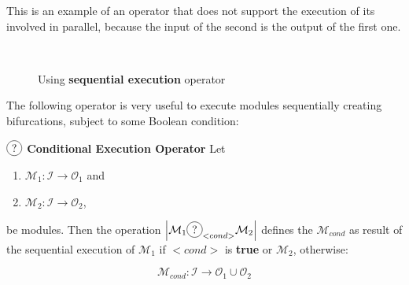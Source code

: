 This is an example of an operator that does not support the execution of its involved \cms{} in parallel, because the input of the second \cm{} is the output of the first one.


\begin{figure}[h]
	\centering
	\hspace{0.05\linewidth}
	\\
	\caption[]{Using {\bf sequential execution} operator}
	\label{fig:seq_example}
\end{figure}

\separation

The following operator is very useful to execute modules sequentially creating bifurcations, subject to some Boolean condition:

\begin{definition}\label{op:conditional}
$\circled{?}$ {\bf Conditional Execution Operator} Let
\begin{enumerate}%
	\item $\mathcal{M}_1 : \mathcal{I} \rightarrow \mathcal{O}_1$ and  
	\item $\mathcal{M}_2 : \mathcal{I} \rightarrow \mathcal{O}_2$,
\end{enumerate}%
be modules. %
Then the operation $\left|\mathcal{M}_1\circled{?}_{<cond>}\mathcal{M}_2\right|$ defines the \cm{} $\mathcal{M}_{cond}$ as result of the sequential execution of $\mathcal{M}_1$ if $<cond>$ is {\bf true} or $\mathcal{M}_2$, otherwise:

\[
\mathcal{M}_{cond}:\mathcal{I} \rightarrow \mathcal{O}_1 \cup \mathcal{O}_2 
\]
\end{definition}

